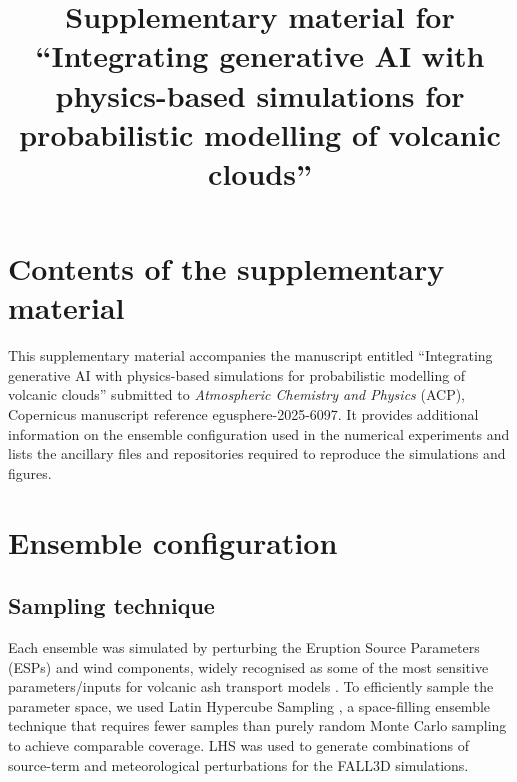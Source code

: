 \documentclass[acp,manuscript,noline]{copernicus}
\begin{document}
\title{Supplementary material for ``Integrating generative AI with physics-based simulations for probabilistic modelling of volcanic clouds''}




\received{}
\revised{}
\accepted{}
\published{}


\maketitle
\tableofcontents

\section{Contents of the supplementary material}

This supplementary material accompanies the manuscript entitled ``Integrating
generative AI with physics-based simulations for probabilistic modelling of
volcanic clouds'' submitted to \textit{Atmospheric Chemistry and Physics}
(ACP), Copernicus manuscript reference egusphere-2025-6097. It provides
additional information on the ensemble configuration used in the numerical
experiments and lists the ancillary files and repositories required to
reproduce the simulations and figures.

\section{Ensemble configuration}

\subsection{Sampling technique}
Each ensemble was simulated by perturbing the Eruption Source Parameters (ESPs)
and wind components, widely recognised as some of the most sensitive
parameters/inputs for volcanic ash transport models \citep{devenish2012,poulidis2018}.
%
To efficiently sample the parameter space, we used Latin Hypercube Sampling
\citep[LHS,][]{mckay1979}, a space-filling ensemble technique that requires
fewer samples than purely random Monte Carlo sampling to achieve comparable
coverage. LHS was used to generate combinations of source-term and
meteorological perturbations for the FALL3D simulations.
\end{document}
